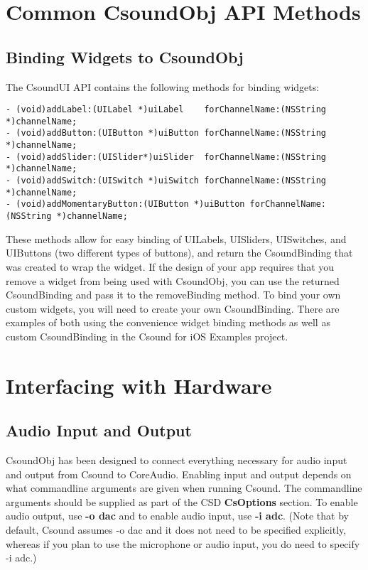 \documentclass[11pt]{article}
\begin{document}

\section{Common CsoundObj API Methods}

\subsection{Binding Widgets to CsoundObj}

The CsoundUI API contains the following methods for binding widgets:

\begin{lstlisting}[caption=Methods for Widget Binding]
- (void)addLabel:(UILabel *)uiLabel    forChannelName:(NSString *)channelName;
- (void)addButton:(UIButton *)uiButton forChannelName:(NSString *)channelName;
- (void)addSlider:(UISlider*)uiSlider  forChannelName:(NSString *)channelName;
- (void)addSwitch:(UISwitch *)uiSwitch forChannelName:(NSString *)channelName;
- (void)addMomentaryButton:(UIButton *)uiButton forChannelName:(NSString *)channelName;

\end{lstlisting}

These methods allow for easy binding of UILabels, UISliders, UISwitches, and UIButtons (two different types of buttons), and return the CsoundBinding that was created to wrap the widget. If the design of your app requires that you remove a widget from being used with CsoundObj, you can use the returned CsoundBinding and pass it to the removeBinding method. To bind your own custom widgets, you will need to create your own CsoundBinding.  There are examples of both using the convenience widget binding methods as well as custom CsoundBinding in the Csound for iOS Examples project.


\section{Interfacing with Hardware}
\subsection{Audio Input and Output}

CsoundObj has been designed to connect everything necessary for audio input and output from Csound to CoreAudio.  Enabling input and output depends on what commandline arguments are given when running Csound.  The commandline arguments should be supplied as part of the CSD \textbf{CsOptions} section.  To enable audio output, use \textbf{-o dac} and to enable audio input, use \textbf{-i adc}. (Note that by default, Csound assumes -o dac and it does not need to be specified explicitly, whereas if you plan to use the microphone or audio input, you do need to specify -i adc.)
\end{document}
